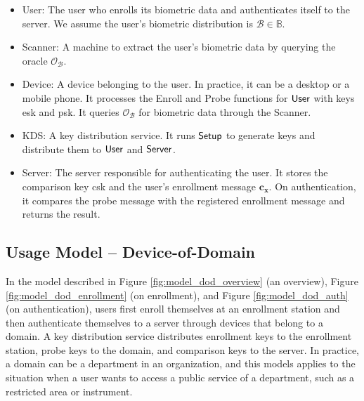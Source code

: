 \begin{itemize}

	\item {\sf User}: The user who enrolls its biometric data and authenticates itself to the server. We assume the user's biometric distribution is $\mathcal{B} \in \mathbb{B}$. 

	\item {\sf Scanner}: A machine to extract the user's biometric data by querying the oracle $\mathcal{O}_{\mathcal{B}}$.
	
	\item {\sf Device}: A device belonging to the user. In practice, it can be a desktop or a mobile phone. It processes the {\sf Enroll} and {\sf Probe} functions for ${\sf User}$ with keys {\sf esk} and {\sf psk}. It queries $\mathcal{O}_{\mathcal{B}}$ for biometric data through the {\sf Scanner}.
	
	\item {\sf KDS}: A key distribution service. It runs ${\sf Setup}$ to generate keys and distribute them to ${\sf User}$ and ${\sf Server}$.
		
	\item {\sf Server}: The server responsible for authenticating the user. It stores the comparison key {\sf csk} and the user's enrollment message $\mathbf{c_x}$. On authentication, it compares the probe message with the registered enrollment message and returns the result.  

\end{itemize}




\pagebreak

\subsection{Usage Model – Device-of-Domain}
\label{sec:dod_model}

In the model described in Figure \ref{fig:model_dod_overview} (an overview), Figure \ref{fig:model_dod_enrollment} (on enrollment), and Figure \ref{fig:model_dod_auth} (on authentication), users first enroll themselves at an enrollment station and then authenticate themselves to a server through devices that belong to a domain.
A key distribution service distributes enrollment keys to the enrollment station, probe keys to the domain, and comparison keys to the server. In practice, a domain can be a department in an organization, and this models applies to the situation when a user wants to access a public service of a department, such as a restricted area or instrument. 

